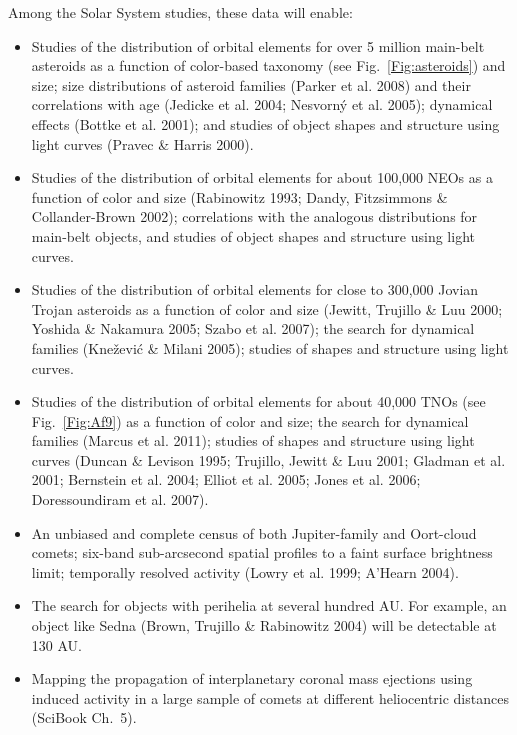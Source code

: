 \documentclass{emulateapj}
\begin{document}
Among the Solar System studies, these data will enable: 
\begin{itemize}
\item Studies of the distribution of orbital elements for over 5 million main-belt 
asteroids as a function of color-based taxonomy (see Fig.~\ref{Fig:asteroids})
and size; size distributions of asteroid families (Parker et al. 2008) and their
correlations with age (Jedicke et al. 2004; Nesvorn\'{y} et al. 2005); dynamical 
effects (Bottke et al. 2001); and studies of object shapes and structure using 
light curves (Pravec \& Harris 2000). 
\item Studies of the distribution of orbital elements for about 100,000 NEOs as a 
function of color and size (Rabinowitz 1993; Dandy, Fitzsimmons \& Collander-Brown 2002);
correlations with the analogous distributions for 
main-belt objects, and studies of object shapes and structure using light curves. 
\item Studies of the distribution of orbital elements for close to 300,000 Jovian Trojan 
asteroids as a function of color and size (Jewitt, Trujillo \& Luu 2000; Yoshida \& 
Nakamura 2005; Szabo et al. 2007); the search for dynamical families (Kne\v{z}evi\'{c} 
\& Milani 2005); studies of shapes and structure using light curves. 
\item Studies of the distribution of orbital elements for about 40,000 TNOs (see 
Fig.~\ref{Fig:Af9}) as a function of color and size; the search for dynamical families
(Marcus et al. 2011); studies of shapes and structure using light curves (Duncan \& Levison 1995;
Trujillo, Jewitt \& Luu 2001; Gladman et al. 2001; Bernstein et al. 2004; 
Elliot et al. 2005; Jones et al. 2006; Doressoundiram et al. 2007).
\item An unbiased and complete census of both Jupiter-family and Oort-cloud
comets; six-band sub-arcsecond spatial profiles to a faint surface brightness
limit; temporally resolved activity (Lowry et al. 1999; A'Hearn 2004). 
\item The search for objects with perihelia at several hundred AU. For example,
an object like Sedna (Brown, Trujillo \& Rabinowitz 2004) will be detectable at 130 AU. 
\item Mapping the propagation of interplanetary coronal mass ejections using induced 
 activity in a large sample of comets at different heliocentric distances
(SciBook Ch.~5).
\end{itemize}
\end{document}
